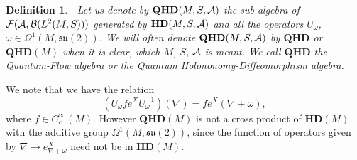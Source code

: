 \documentclass[12pt]{article}
\def\ca{{\cal A}}
\def\cb{{\cal B}}
\def\ce{{\cal E}}
\def\cf{{\cal F}}
\def\cp{{\cal P}}
\newtheorem{definition}[thm]{Definition}
\begin{document}
\begin{definition}

 $\;$ Let us denote by $\mathbf{QHD}(M,S,\ca)$ the sub-algebra of $\cf (\ca , \cb (L^2(M, S)) )$ generated by $\mathbf{HD}(M,S,\ca)$ and all the operators $U_{ \omega} $, $\omega \in \Omega^1(M,\mathfrak{su}(2))$. 
%
We will often denote $\mathbf{QHD}(M,S,\ca)$ by $\mathbf{QHD}$ or $\mathbf{QHD}(M)$ when it is clear, which $M$, $S$, $\ca$ is meant. 
%
We call $\mathbf{QHD}$ the Quantum-Flow algebra or the Quantum Holononomy-Diffeomorphism algebra.
\end{definition}

We note that we have the relation 
\begin{equation} \label{konj}
(U_{\omega}f e^X U_{ \omega}^{-1}) (\nabla) =f e^X (\nabla + \omega )  , 
\end{equation}
where $f\in C^ \infty_c(M)$. However $\mathbf{QHD}(M)$ is not a cross product of $\mathbf{HD}(M)$ with the additive group $\Omega^1 (M,\mathfrak{su}(2))$, since the function of operators given by $\nabla \to e^X_{\nabla +  \omega}$ need not be in $\mathbf{HD}(M)$.




\end{document}
